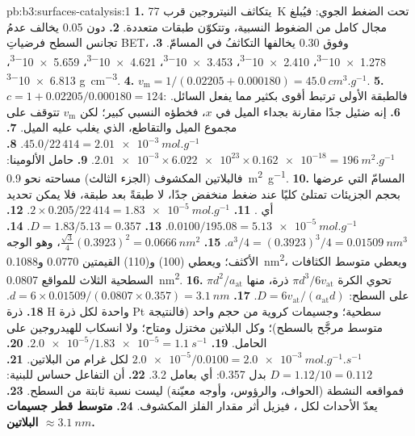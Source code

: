 \begin{solution}{pb:b3:surfaces-catalysis:1}
\textbf{1.} يتكاثف النيتروجين قرب \qty{77}{K} تحت الضغط الجوي: فيُبلغ مجال كامل من
الضغوط النسبية، وتتكوّن طبقات متعددة.
\textbf{2.} دون 0.05 يخالف عدمُ تجانس السطح فرضياتِ BET، وفوق 0.30 يخالفها التكاثفُ في
المسامّ.
\textbf{3.} \num{1.278e-3}، \num{2.410e-3}، \num{3.453e-3}، \num{4.621e-3}، \num{5.659e-3}، \num{6.813e-3} \unit{g.cm^{-3}}.
\textbf{4.} $v_{\mathrm m} = 1/(0.02205 + 0.000180) = \qty{45.0}{cm^3.g^{-1}}$.
\textbf{5.} $c = 1 + 0.02205/0.000180 = 124$: فالطبقة الأولى ترتبط أقوى بكثير مما
يفعل السائل.
\textbf{6.} إنه ضئيل جدًا مقارنة بجداء الميل في $x$، فخطؤه النسبي كبير؛
لكن $v_{\mathrm m}$ تتوقف على مجموع الميل والتقاطع، الذي يغلب عليه الميل.
\textbf{7.} $45.0/22\,414 = \qty{2.01e-3}{mol.g^{-1}}$.
\textbf{8.} $\num{2.01e-3} \times \num{6.022e23} \times \num{0.162e-18} = \qty{196}{m^2.g^{-1}}$.
\textbf{9.} حامل الألومينا: فالبلاتين المكشوف (الجزء الثالث) مساحته نحو \qty{0.9}{m^2.g^{-1}}.
\textbf{10.} المسامّ التي عرضها بحجم الجزيئات تمتلئ كليًا عند ضغط منخفض جدًا، لا طبقةً
بعد طبقة، فلا يمكن تحديد أي .
\textbf{11.} $2 \times 0.205/22\,414 = \qty{1.83e-5}{mol.g^{-1}}$.
\textbf{12.} $0.0100/195.08 = \qty{5.13e-5}{mol.g^{-1}}$.
\textbf{13.} $D = 1.83/5.13 = 0.357$.
\textbf{14.} $a^3/4 = (0.3923)^3/4 = \qty{0.01509}{nm^3}$.
\textbf{15.} $\frac{\sqrt3}{4}(0.3923)^2 = \qty{0.0666}{nm^2}$، وهو الوجه الأكثف؛ ويعطي (100) و(110) القيمتين 0.0770 
و\qty{0.1088}{nm^2}، ويعطي متوسط الكثافات السطحية الثلاث للمواقع \qty{0.0807}{nm^2}.
\textbf{16.} تحوي الكرة $\pi d^3/6v_{\mathrm{at}}$ ذرة، منها $\pi d^2/a_{\mathrm{at}}$ على السطح:
$D = 6v_{\mathrm{at}}/(a_{\mathrm{at}}d)$.
\textbf{17.} $d = 6 \times 0.01509/(0.0807 \times 0.357) = \qty{3.1}{nm}$.
\textbf{18.} ذرة H واحدة لكل ذرة Pt سطحية؛ وجسيمات كروية من حجم واحد (فالنتيجة
متوسط مرجَّح بالسطح)؛ وكل البلاتين مختزل ومتاح؛ ولا انسكاب للهيدروجين
على الحامل.
\textbf{19.} $\num{2.0e-5}/\num{1.83e-5} = \qty{1.1}{s^{-1}}$.
\textbf{20.} $\num{2.0e-5}/0.0100 = \qty{2.0e-3}{mol.g^{-1}.s^{-1}}$ لكل غرام من البلاتين.
\textbf{21.} $D = 1.12/10 = 0.112$ بدل 0.357: أي بعامل 3.2.
\textbf{22.} أن التفاعل حساس للبنية: فمواقعه النشطة (الحواف،
والرؤوس، وأوجه معيّنة) ليست نسبة ثابتة من السطح.
\textbf{23.} يعدّ الأحداث لكل ، فيزيل أثر مقدار
الفلز المكشوف.
\textbf{24.} \textbf{متوسط قطر جسيمات البلاتين $\approx \qty{3.1}{nm}$.}
\end{solution}
